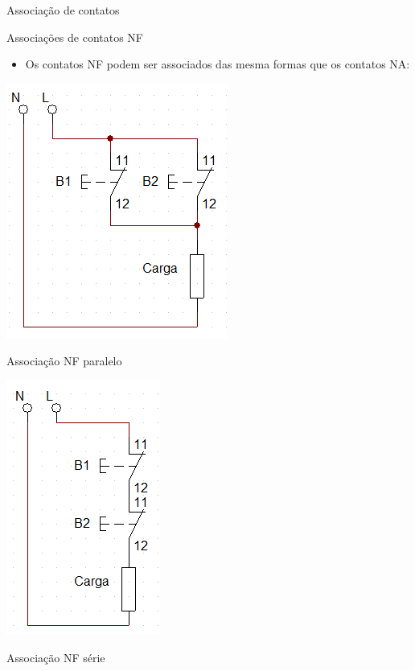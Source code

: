 \begin{frame}{Associação de contatos}
\begin{block}{Associações de contatos NF}
\begin{itemize}
    \item Os contatos NF podem ser associados das mesma formas que os contatos NA:
\end{itemize}
\end{block}

\begin{minipage}{0.45\linewidth}
	\centering
	\includegraphics[width=0.7\linewidth]{Figuras/Ch06/fig6.jpg}
	
	Associação NF paralelo
\end{minipage}
\hfill
\begin{minipage}{0.45\linewidth}
	\centering
	\includegraphics[width=0.5\linewidth]{Figuras/Ch06/fig7.jpg}
	
	Associação NF série
\end{minipage}
\end{frame}


